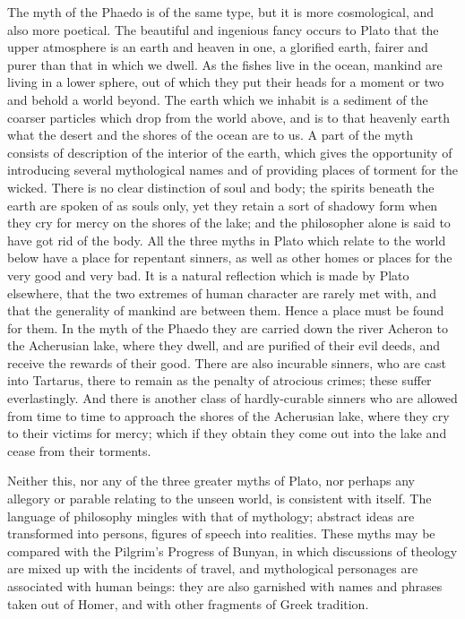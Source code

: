 \documentclass[11pt,letter]{article}
\begin{document}
\par  The myth of the Phaedo is of the same type, but it is more cosmological, and also more poetical. The beautiful and ingenious fancy occurs to Plato that the upper atmosphere is an earth and heaven in one, a glorified earth, fairer and purer than that in which we dwell. As the fishes live in the ocean, mankind are living in a lower sphere, out of which they put their heads for a moment or two and behold a world beyond. The earth which we inhabit is a sediment of the coarser particles which drop from the world above, and is to that heavenly earth what the desert and the shores of the ocean are to us. A part of the myth consists of description of the interior of the earth, which gives the opportunity of introducing several mythological names and of providing places of torment for the wicked. There is no clear distinction of soul and body; the spirits beneath the earth are spoken of as souls only, yet they retain a sort of shadowy form when they cry for mercy on the shores of the lake; and the philosopher alone is said to have got rid of the body. All the three myths in Plato which relate to the world below have a place for repentant sinners, as well as other homes or places for the very good and very bad. It is a natural reflection which is made by Plato elsewhere, that the two extremes of human character are rarely met with, and that the generality of mankind are between them. Hence a place must be found for them. In the myth of the Phaedo they are carried down the river Acheron to the Acherusian lake, where they dwell, and are purified of their evil deeds, and receive the rewards of their good. There are also incurable sinners, who are cast into Tartarus, there to remain as the penalty of atrocious crimes; these suffer everlastingly. And there is another class of hardly-curable sinners who are allowed from time to time to approach the shores of the Acherusian lake, where they cry to their victims for mercy; which if they obtain they come out into the lake and cease from their torments.

\par  Neither this, nor any of the three greater myths of Plato, nor perhaps any allegory or parable relating to the unseen world, is consistent with itself. The language of philosophy mingles with that of mythology; abstract ideas are transformed into persons, figures of speech into realities. These myths may be compared with the Pilgrim’s Progress of Bunyan, in which discussions of theology are mixed up with the incidents of travel, and mythological personages are associated with human beings: they are also garnished with names and phrases taken out of Homer, and with other fragments of Greek tradition.
\end{document}
